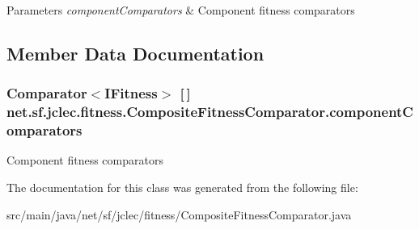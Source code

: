 \begin{DoxyParams}{Parameters}
{\em component\-Comparators} & Component fitness comparators \\
\hline
\end{DoxyParams}


\subsection{Member Data Documentation}
\hypertarget{classnet_1_1sf_1_1jclec_1_1fitness_1_1_composite_fitness_comparator_a8448c857b752923973aba83432b52253}{
\subsubsection[{component\-Comparators}]{\setlength{\rightskip}{0pt plus 5cm}Comparator$<${\bf I\-Fitness}$>$ \mbox{[}$\,$\mbox{]} net.\-sf.\-jclec.\-fitness.\-Composite\-Fitness\-Comparator.\-component\-Comparators\hspace{0.3cm}{\ttfamily [protected]}}}\label{classnet_1_1sf_1_1jclec_1_1fitness_1_1_composite_fitness_comparator_a8448c857b752923973aba83432b52253}
Component fitness comparators 

The documentation for this class was generated from the following file\-:\begin{DoxyCompactItemize}
\item 
src/main/java/net/sf/jclec/fitness/Composite\-Fitness\-Comparator.\-java\end{DoxyCompactItemize}
